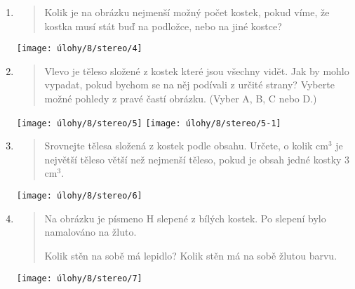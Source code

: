 \begin{enumerate}
    \item
    \begin{minipage}[t]{\linewidth}
        \begin{quote}
            Kolik je na obrázku nejmenší možný počet kostek, pokud víme, že kostka musí stát buď na podložce, nebo na jiné kostce?
        \end{quote}
        \centering
        \texttt{[image: úlohy/8/stereo/4]}
    \end{minipage}

    \item
    \begin{minipage}[t]{\linewidth}
        \begin{quote}
            Vlevo je těleso složené z kostek které jsou všechny vidět. Jak by mohlo vypadat, pokud bychom se na něj podívali z určité strany? Vyberte možné pohledy z pravé častí obrázku. (Vyber A, B, C nebo D.)
        \end{quote}
        \centering

        \texttt{[image: úlohy/8/stereo/5]}
        \texttt{[image: úlohy/8/stereo/5-1]}
    \end{minipage}

    \item
    \begin{minipage}[t]{\linewidth}
        \begin{quote}
            Srovnejte tělesa složená z kostek podle obsahu. Určete, o kolik cm$^{3}$ je největší těleso větší než nejmenší těleso, pokud je obsah jedné kostky 3 cm$^{3}$.
        \end{quote}
        \centering
        \texttt{[image: úlohy/8/stereo/6]}
    \end{minipage}

    \item
    \begin{minipage}[t]{\linewidth}
        \begin{quote}
            Na obrázku je písmeno H slepené z bílých kostek. Po slepení bylo namalováno na žluto.

            Kolik stěn na sobě má lepidlo? Kolik stěn má na sobě žlutou barvu.
        \end{quote}
        \centering
        \texttt{[image: úlohy/8/stereo/7]}
    \end{minipage}


\end{enumerate}
